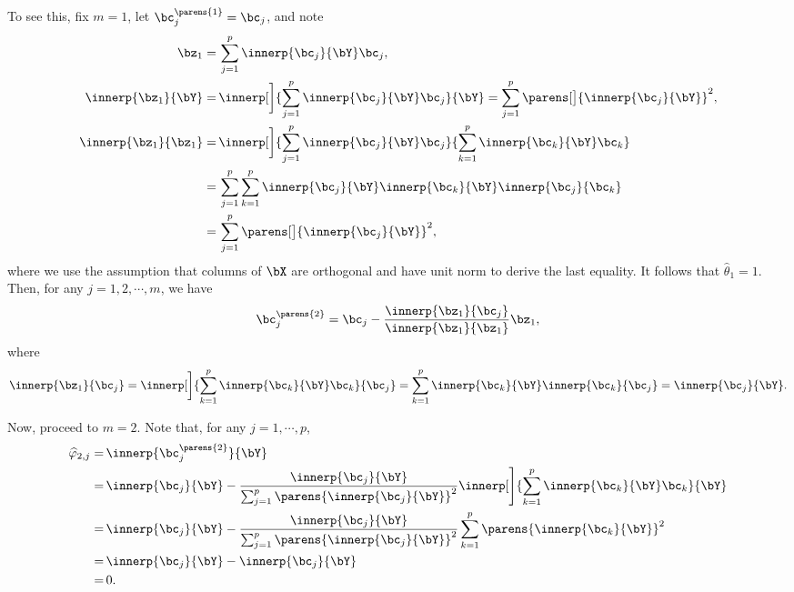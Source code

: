 \documentclass[12pt]{article}
\begin{document}
\begin{enumerate}[label=\textbf{\arabic*.}]
\begin{enumerate}
\begin{enumerate}
		To see this, fix $m = 1$, let $\bc^{\parens{1}}_j = \bc_j$, and note 
		\begin{align*}
			\bz_1 = & \, \sum_{j=1}^p \innerp{\bc_j}{\bY} \bc_j, \\ 
			\innerp{\bz_1}{\bY} = & \, \innerp[\bigg]{\sum_{j=1}^p \innerp{\bc_j}{\bY} \bc_j}{\bY} = \sum_{j=1}^p \parens[\big]{\innerp{\bc_j}{\bY}}^2, \\ 
			\innerp{\bz_1}{\bz_1} = & \, \innerp[\bigg]{\sum_{j=1}^p \innerp{\bc_j}{\bY} \bc_j}{\sum_{k=1}^p \innerp{\bc_k}{\bY} \bc_k} \\ 
			= & \, \sum_{j=1}^p \sum_{k=1}^p \innerp{\bc_j}{\bY} \innerp{\bc_k}{\bY} \innerp{\bc_j}{\bc_k} \\ 
			= & \, \sum_{j=1}^p \parens[\big]{\innerp{\bc_j}{\bY}}^2, 
		\end{align*}
		where we use the assumption that columns of $\bX$ are orthogonal and have unit norm to derive the last equality. It follows that $\hat{\theta}_1 = 1$. Then, for any $j = 1, 2, \cdots, m$, we have 
		\begin{align*}
			\bc_j^{\parens{2}} = \bc_j - \frac{\innerp{\bz_1}{\bc_j}}{\innerp{\bz_1}{\bz_1}} \bz_1, 
		\end{align*}
		where 
		\begin{align*}
			\innerp{\bz_1}{\bc_j} = \innerp[\bigg]{\sum_{k=1}^p \innerp{\bc_k}{\bY} \bc_k}{\bc_j} = \sum_{k=1}^p \innerp{\bc_k}{\bY} \innerp{\bc_k}{\bc_j} = \innerp{\bc_j}{\bY}. 
		\end{align*}
		
		Now, proceed to $m=2$. Note that, for any $j = 1, \cdots, p$, 
		\begin{align*}
			\widehat{\varphi}_{2,j} = & \, \innerp{\bc_j^{\parens{2}}}{\bY} \\ 
			= & \, \innerp{\bc_j}{\bY} - \frac{\innerp{\bc_j}{\bY}}{\sum_{j=1}^p \parens{\innerp{\bc_j}{\bY}}^2} \innerp[\Bigg]{\sum_{k=1}^p \innerp{\bc_k}{\bY} \bc_k}{\bY} \\ 
			= & \, \innerp{\bc_j}{\bY} - \frac{\innerp{\bc_j}{\bY}}{\sum_{j=1}^p \parens{\innerp{\bc_j}{\bY}}^2} \sum_{k=1}^p \parens{\innerp{\bc_k}{\bY} }^2 \\ 
			= & \, \innerp{\bc_j}{\bY} - \innerp{\bc_j}{\bY} \\ 
			= & \, 0. 
		\end{align*}
		\end{enumerate}
	\end{enumerate}
	

\end{enumerate}
\end{document}
